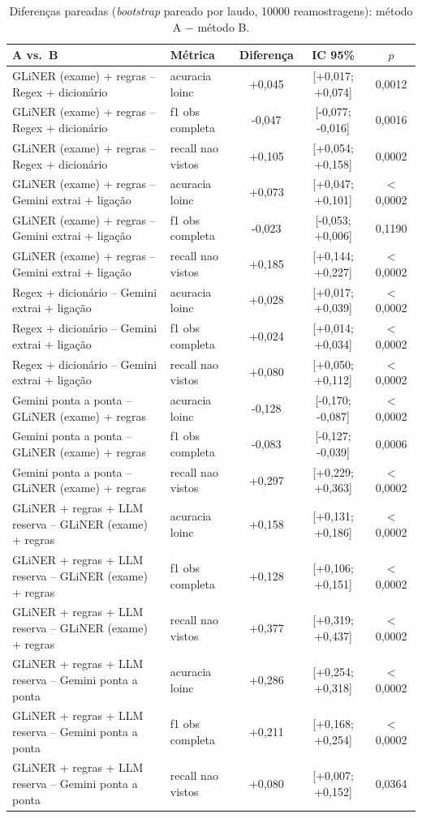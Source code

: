 \begin{table}[ht]\centering\small
\caption{Diferenças pareadas (\textit{bootstrap} pareado por laudo, 10000 reamostragens): método A $-$ método B.}\label{tab:dif}
\begin{tabular}{llccc}\toprule
A vs.\ B & Métrica & Diferença & IC 95\% & $p$\\\midrule
GLiNER (exame) + regras -- Regex + dicionário & acuracia loinc & +0,045 & [+0,017; +0,074] & 0,0012\\
GLiNER (exame) + regras -- Regex + dicionário & f1 obs completa & -0,047 & [-0,077; -0,016] & 0,0016\\
GLiNER (exame) + regras -- Regex + dicionário & recall nao vistos & +0,105 & [+0,054; +0,158] & 0,0002\\
GLiNER (exame) + regras -- Gemini extrai + ligação & acuracia loinc & +0,073 & [+0,047; +0,101] & $<$0,0002\\
GLiNER (exame) + regras -- Gemini extrai + ligação & f1 obs completa & -0,023 & [-0,053; +0,006] & 0,1190\\
GLiNER (exame) + regras -- Gemini extrai + ligação & recall nao vistos & +0,185 & [+0,144; +0,227] & $<$0,0002\\
Regex + dicionário -- Gemini extrai + ligação & acuracia loinc & +0,028 & [+0,017; +0,039] & $<$0,0002\\
Regex + dicionário -- Gemini extrai + ligação & f1 obs completa & +0,024 & [+0,014; +0,034] & $<$0,0002\\
Regex + dicionário -- Gemini extrai + ligação & recall nao vistos & +0,080 & [+0,050; +0,112] & $<$0,0002\\
Gemini ponta a ponta -- GLiNER (exame) + regras & acuracia loinc & -0,128 & [-0,170; -0,087] & $<$0,0002\\
Gemini ponta a ponta -- GLiNER (exame) + regras & f1 obs completa & -0,083 & [-0,127; -0,039] & 0,0006\\
Gemini ponta a ponta -- GLiNER (exame) + regras & recall nao vistos & +0,297 & [+0,229; +0,363] & $<$0,0002\\
GLiNER + regras + LLM reserva -- GLiNER (exame) + regras & acuracia loinc & +0,158 & [+0,131; +0,186] & $<$0,0002\\
GLiNER + regras + LLM reserva -- GLiNER (exame) + regras & f1 obs completa & +0,128 & [+0,106; +0,151] & $<$0,0002\\
GLiNER + regras + LLM reserva -- GLiNER (exame) + regras & recall nao vistos & +0,377 & [+0,319; +0,437] & $<$0,0002\\
GLiNER + regras + LLM reserva -- Gemini ponta a ponta & acuracia loinc & +0,286 & [+0,254; +0,318] & $<$0,0002\\
GLiNER + regras + LLM reserva -- Gemini ponta a ponta & f1 obs completa & +0,211 & [+0,168; +0,254] & $<$0,0002\\
GLiNER + regras + LLM reserva -- Gemini ponta a ponta & recall nao vistos & +0,080 & [+0,007; +0,152] & 0,0364\\
\bottomrule\end{tabular}\end{table}
